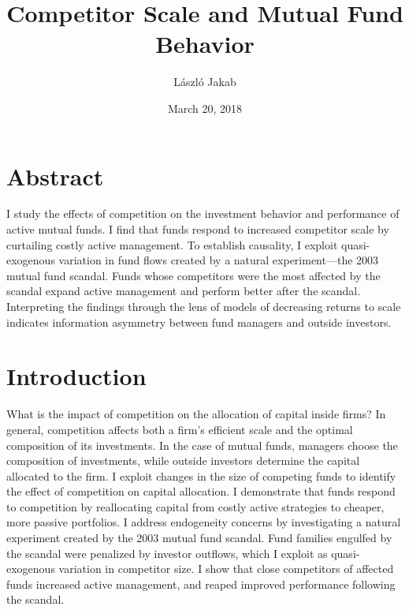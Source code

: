 \documentclass[openany]{book}
\title{Competitor Scale and Mutual Fund Behavior}
\author{László Jakab}
\date{March 20, 2018}
\theoremstyle{definition}
\theoremstyle{definition}
\theoremstyle{definition}
\theoremstyle{remark}
\begin{document}
\maketitle

{
\setcounter{tocdepth}{1}
\tableofcontents
}
\onehalfspacing

\chapter*{Abstract}\label{abstract}

I study the effects of competition on the investment behavior and
performance of active mutual funds. I find that funds respond to
increased competitor scale by curtailing costly active management. To
establish causality, I exploit quasi-exogenous variation in fund flows
created by a natural experiment---the 2003 mutual fund scandal. Funds
whose competitors were the most affected by the scandal expand active
management and perform better after the scandal. Interpreting the
findings through the lens of models of decreasing returns to scale
indicates information asymmetry between fund managers and outside
investors.

\chapter{Introduction}\label{introduction}

What is the impact of competition on the allocation of capital inside
firms? In general, competition affects both a firm's efficient scale and
the optimal composition of its investments. In the case of mutual funds,
managers choose the composition of investments, while outside investors
determine the capital allocated to the firm. I exploit changes in the
size of competing funds to identify the effect of competition on capital
allocation. I demonstrate that funds respond to competition by
reallocating capital from costly active strategies to cheaper, more
passive portfolios. I address endogeneity concerns by investigating a
natural experiment created by the 2003 mutual fund scandal. Fund
families engulfed by the scandal were penalized by investor outflows,
which I exploit as quasi-exogenous variation in competitor size. I show
that close competitors of affected funds increased active management,
and reaped improved performance following the scandal.
\end{document}
